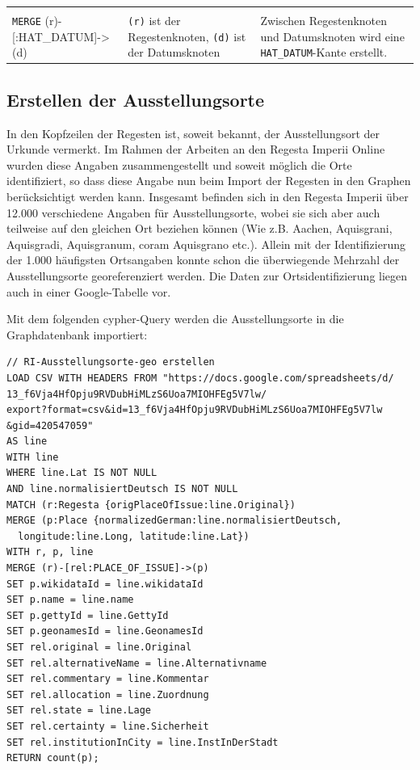 \documentclass[ngerman,]{scrreprt}
\begin{document}
\begin{longtable}[]{@{}lll@{}}
\begin{minipage}[t]{0.37\columnwidth}
\end{minipage}\tabularnewline
\begin{minipage}[t]{0.31\columnwidth}\raggedright
\texttt{MERGE} (r)-{[}:HAT\_DATUM{]}-\textgreater{}(d)\strut
\end{minipage} & \begin{minipage}[t]{0.23\columnwidth}\raggedright
\texttt{(r)} ist der Regestenknoten, \texttt{(d)} ist der Datumsknoten\strut
\end{minipage} & \begin{minipage}[t]{0.37\columnwidth}\raggedright
Zwischen Regestenknoten und Datumsknoten wird eine \texttt{HAT\_DATUM}-Kante erstellt.\strut
\end{minipage}\tabularnewline
\bottomrule
\end{longtable}

\hypertarget{erstellen-der-ausstellungsorte}{%
\subsection{Erstellen der Ausstellungsorte}\label{erstellen-der-ausstellungsorte}}

In den Kopfzeilen der Regesten ist, soweit bekannt, der Ausstellungsort der Urkunde vermerkt. Im Rahmen der Arbeiten an den Regesta Imperii Online wurden diese Angaben zusammengestellt und soweit möglich die Orte identifiziert, so dass diese Angabe nun beim Import der Regesten in den Graphen berücksichtigt werden kann. Insgesamt befinden sich in den Regesta Imperii über 12.000 verschiedene Angaben für Ausstellungsorte, wobei sie sich aber auch teilweise auf den gleichen Ort beziehen können (Wie z.B. Aachen, Aquisgrani, Aquisgradi, Aquisgranum, coram Aquisgrano etc.). Allein mit der Identifizierung der 1.000 häufigsten Ortsangaben konnte schon die überwiegende Mehrzahl der Ausstellungsorte georeferenziert werden. Die Daten zur Ortsidentifizierung liegen auch in einer Google-Tabelle vor.

Mit dem folgenden cypher-Query werden die Ausstellungsorte in die Graphdatenbank importiert:

\begin{verbatim}
// RI-Ausstellungsorte-geo erstellen
LOAD CSV WITH HEADERS FROM "https://docs.google.com/spreadsheets/d/
13_f6Vja4HfOpju9RVDubHiMLzS6Uoa7MIOHFEg5V7lw/
export?format=csv&id=13_f6Vja4HfOpju9RVDubHiMLzS6Uoa7MIOHFEg5V7lw
&gid=420547059"
AS line
WITH line
WHERE line.Lat IS NOT NULL
AND line.normalisiertDeutsch IS NOT NULL
MATCH (r:Regesta {origPlaceOfIssue:line.Original})
MERGE (p:Place {normalizedGerman:line.normalisiertDeutsch,
  longitude:line.Long, latitude:line.Lat})
WITH r, p, line
MERGE (r)-[rel:PLACE_OF_ISSUE]->(p)
SET p.wikidataId = line.wikidataId
SET p.name = line.name
SET p.gettyId = line.GettyId
SET p.geonamesId = line.GeonamesId
SET rel.original = line.Original
SET rel.alternativeName = line.Alternativname
SET rel.commentary = line.Kommentar
SET rel.allocation = line.Zuordnung
SET rel.state = line.Lage
SET rel.certainty = line.Sicherheit
SET rel.institutionInCity = line.InstInDerStadt
RETURN count(p);
\end{verbatim}
\end{document}
